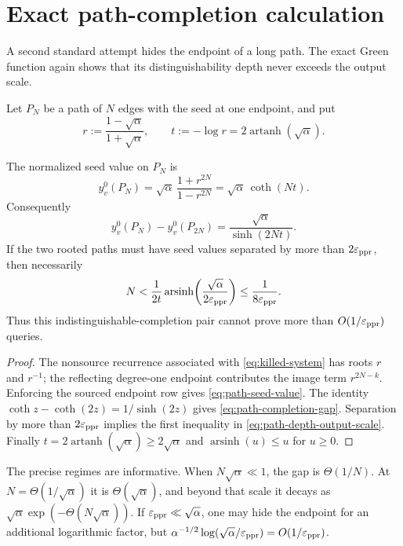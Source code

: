 \section{Exact path-completion calculation}
\label{sec:path-completion}

A second standard attempt hides the endpoint of a long path.  The exact
Green function again shows that its distinguishability depth never exceeds
the output scale.

Let $P_N$ be a path of $N$ edges with the seed at one endpoint, and put
\begin{equation}
 r:=\frac{1-\sqrt\alpha}{1+\sqrt\alpha},
 \qquad
 t:=-\log r
 =2\operatorname{artanh}(\sqrt\alpha).
 \label{eq:path-decay}
\end{equation}

\begin{proposition}
\label{prop:path-completion}
The normalized seed value on $P_N$ is
\begin{equation}
 y_v^0(P_N)
 =\sqrt\alpha\,
  \frac{1+r^{2N}}{1-r^{2N}}
 =\sqrt\alpha\,\coth(Nt).
 \label{eq:path-seed-value}
\end{equation}
Consequently
\begin{equation}
 y_v^0(P_N)-y_v^0(P_{2N})
 =\frac{\sqrt\alpha}{\sinh(2Nt)}.
 \label{eq:path-completion-gap}
\end{equation}
If the two rooted paths must have seed values separated by more than
$2\varepsilon_{\mathrm{ppr}}$, then necessarily
\begin{equation}
 N
 <\frac{1}{2t}
   \operatorname{arsinh}\!\left(
      \frac{\sqrt\alpha}{2\varepsilon_{\mathrm{ppr}}}
   \right)
 \leq\frac1{8\varepsilon_{\mathrm{ppr}}}.
 \label{eq:path-depth-output-scale}
\end{equation}
Thus this indistinguishable-completion pair cannot prove more than
$O(1/\varepsilon_{\mathrm{ppr}})$ queries.
\end{proposition}

\begin{proof}
The nonsource recurrence associated with \cref{eq:killed-system} has roots
$r$ and $r^{-1}$; the reflecting degree-one endpoint contributes the image
term $r^{2N-k}$.  Enforcing the sourced endpoint row gives
\cref{eq:path-seed-value}.  The identity
$\coth z-\coth(2z)=1/\sinh(2z)$ gives
\cref{eq:path-completion-gap}.  Separation by more than $2\varepsilon_{\mathrm{ppr}}$ implies
the first inequality in \cref{eq:path-depth-output-scale}.  Finally
$t=2\operatorname{artanh}(\sqrt\alpha)\geq2\sqrt\alpha$ and
$\operatorname{arsinh}(u)\leq u$ for $u\geq0$.
\end{proof}

The precise regimes are informative.  When
$N\sqrt\alpha\ll1$, the gap is $\Theta(1/N)$.  At
$N=\Theta(1/\sqrt\alpha)$ it is $\Theta(\sqrt\alpha)$, and beyond that scale
it decays as
$\sqrt\alpha\exp(-\Theta(N\sqrt\alpha))$.  If
$\varepsilon_{\mathrm{ppr}}\ll\sqrt\alpha$, one may hide the endpoint for an additional
logarithmic factor, but
$\alpha^{-1/2}\log(\sqrt\alpha/\varepsilon_{\mathrm{ppr}})=O(1/\varepsilon_{\mathrm{ppr}})$.
